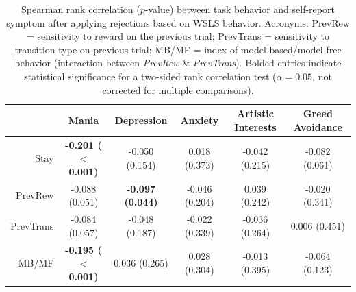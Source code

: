 \documentclass[a4paper,notitlepage,12pt]{article}
\begin{document}
\begin{refsection}[supp]
\begin{table}[H]
    \centering
    \begin{adjustbox}{center}   
    \small
    \begin{tabular}{rccccc}
        \toprule
        {} & Mania & Depression & Anxiety & Artistic Interests & Greed Avoidance \\
        \midrule
        Stay      &  \textbf{-0.201 ($<$0.001)} &           -0.050 (0.154) &   0.018 (0.373) &  -0.042 (0.215) &  -0.082 (0.061) \\
        PrevRew   &              -0.088 (0.051) &  \textbf{-0.097 (0.044)} &  -0.046 (0.204) &   0.039 (0.242) &  -0.020 (0.341) \\
        PrevTrans &              -0.084 (0.057) &           -0.048 (0.187) &  -0.022 (0.339) &  -0.036 (0.264) &   0.006 (0.451) \\
        MB/MF     &  \textbf{-0.195 ($<$0.001)} &            0.036 (0.265) &   0.028 (0.304) &  -0.013 (0.395) &  -0.064 (0.123) \\
        \bottomrule
    \end{tabular}
    \end{adjustbox}
    \caption{Spearman rank correlation ($p$-value) between task behavior and self-report symptom after applying rejections based on WSLS behavior. Acronyms: PrevRew = sensitivity to reward on the previous trial; PrevTrans = sensitivity to transition type on previous trial; MB/MF = index of model-based/model-free behavior (interaction between \textit{PrevRew} \& \textit{PrevTrans}). Bolded entries indicate statistical significance for a two-sided rank correlation test ($\alpha = 0.05$, not corrected for multiple comparisons).}
\end{table}


\end{refsection}
\end{document}
